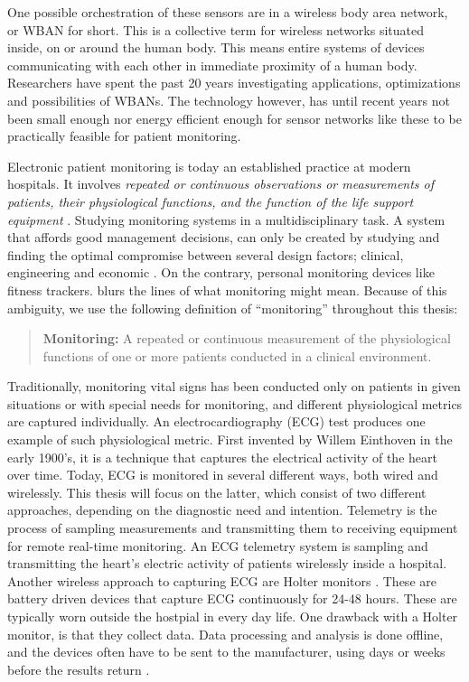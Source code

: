 One possible orchestration of these sensors are in a wireless body area network, or WBAN for short. This is a collective term for wireless networks situated inside, on or around the human body. This means entire systems of devices communicating with each other in immediate proximity of a human body. Researchers have spent the past 20 years investigating applications, optimizations and possibilities of WBANs. The technology however, has until recent years not been small enough nor energy efficient enough for sensor networks like these to be practically feasible for patient monitoring.

Electronic patient monitoring is today an established practice at modern hospitals. It involves \textit{repeated or continuous observations or measurements of patients, their physiological functions, and the function of the life support equipment} \cite{PMID:10315668}. Studying monitoring systems in a multidisciplinary task. A system that affords good management decisions, can only be created by studying and finding the optimal compromise between several design factors; clinical, engineering and economic \cite{Anonymous:yOjY0N0Y}. On the contrary, personal monitoring devices like fitness trackers. blurs the lines of what monitoring might mean. Because of this ambiguity, we use the following definition of ``monitoring'' throughout this thesis: 

\begin{quote}
\textbf{Monitoring:} A repeated or continuous measurement of the physiological functions of one or more patients conducted in a clinical environment.
\end{quote}

\noindent Traditionally, monitoring vital signs has been conducted only on patients in given situations or with special needs for monitoring, and different physiological metrics are captured individually. An electrocardiography (ECG) test produces one example of such physiological metric. First invented by Willem Einthoven in the early 1900's, it is a technique that captures the electrical activity of the heart over time. Today, ECG is monitored in several different ways, both wired and wirelessly. This thesis will focus on the latter, which consist of two different approaches, depending on the diagnostic need and intention. Telemetry is the process of sampling measurements and transmitting them to receiving equipment for remote real-time monitoring. An ECG telemetry system is sampling and transmitting the heart's electric activity of patients wirelessly inside a hospital. Another wireless approach to capturing ECG are Holter monitors \cite{holter:13}. These are battery driven devices that capture ECG continuously for 24-48 hours. These are typically worn outside the hostpial in every day life. One drawback with a Holter monitor, is that they collect data. Data processing and analysis is done offline, and the devices often have to be sent to the manufacturer, using days or weeks before the results return \cite{ziopatch:14}.

